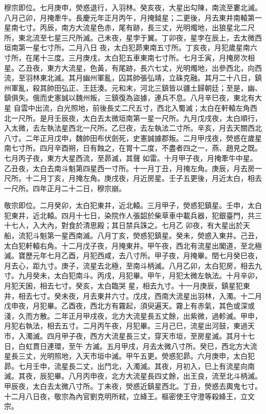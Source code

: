 \begin{pinyinscope}
 穆宗即位。七月庚申，熒惑退行，入羽林。癸亥夜，大星出勾陳，南流至婁北滅。八月己卯，月掩牽牛。長慶元年正月丙午，月掩鉞星；二更後，月去東井南轅第一星南七寸。丙辰，南方大流星色赤，尾有跡，長三丈，光明燭地，出狼星北二尺所，東北流至七星三尺所滅。己未夜，星孛于翼。丁卯夜，星孛在辰上，去太微西垣南第一星七寸所。二月八日
 夜，太白犯昴東南五寸所。丁亥夜，月犯歲星南六寸所，在尾十三度。三月庚戌，太白犯五車東南七寸所。七月壬寅，月掩房次相星。乙丑夜，東方大流星，色黃，有尾跡，長六七丈，光明燭地，出參西北，向西流，至羽林東北滅。其月幽州軍亂，囚其帥張弘靖，立硃克融。其月二十八日，鎮州軍亂，殺其帥田弘正、王廷湊。元和末，河北三鎮皆以疆土歸朝廷；至是，幽、鎮俱失。俄而史憲誠以魏州叛，三鎮復為盜據，連兵不息。八月辛巳夜，東北有大星
 自雲中出流，白光照地，前後長丈二尺五寸，西北入蜀滅；太白在軒轅左角西北一尺所。是月壬辰夜，太白去太微垣南第一星一尺所。九月戊戌夜，太白順行，入太微，去左執法星西北一尺所。乙巳夜，去左執法二寸所。辛亥，月去天關西北八寸。二年正月戊申，魏帥田布伏劍死，史憲誠據郡叛。二月甲戌夜，熒惑在歲星南七寸所。四月辛酉朔，日有蝕之，在胃十二度，不盡者四之一，燕、趙見之既。七月丙子夜，東方大星西流，至昴滅，其聲
 如雷。十月甲子夜，月掩牽牛中星。乙丑夜，太白去南斗魁第四星西一寸所。十一月丁丑，月掩左角。庚辰，月去房一尺所。十二月丁亥，月掩左角。庚戌夜，月近房星。壬子五更後，月近太白，相去一尺所。四年正月二十二日，穆宗崩。



 敬宗即位。二月癸卯，太白犯東井，近北轅。三月甲子，熒惑犯鎮星。壬申，太白犯東井，近北轅。四月十七日，染院作人張韶於柴草車中載兵器，犯銀臺門，共三十七人，入大內，對食於清思殿；其日禁兵誅之。七月乙
 卯夜，有大星出於天船，流犯斗魁第一星西南滅。八月丁亥，熒惑犯鎮星。癸未，熒惑入東井。己丑，太白犯軒轅右角。十二月戊子夜，月掩東井。甲午夜，西北有流星出閣道，至北極滅。寶歷元年七月乙酉，月犯西咸，去八寸所。甲子夜，月掩畢。閏七月癸巳夜，月去心，距九寸。庚子，流星去北極，至南斗柄滅。八月乙卯，太白犯房，相去九寸。九月癸未，太白犯南斗。丙戌，月犯畢。甲午，月犯太微左執法。十月辛卯，月犯天囷，相去七寸。癸亥，太白臨哭
 星，相去九寸。十一月庚辰，鎮星犯東井，相去七寸。癸未夜，月去東井六寸。戊戌，西南大流星出羽林，入濁。十二月戊申夜，月犯畢。乙酉夜，西北方有霧起，須臾遍天。霧上有赤氣，其色或深或淺，久而方散。二年正月甲戌夜，北方大流星長五丈餘，出紫微，過軫滅。甲申，月犯右執法，相去五寸。二月丙午夜，月犯畢。三月己巳，流星出河鼓，東過天市，入濁滅。四月甲子夜，西方大流星長三丈，穿天市垣，至房星滅。其月十七日，白虹貫日連環，至午
 方滅。五月甲戌，月去太微八寸所。癸巳，西北方大流星長三丈，光明照地，入天市垣中滅。甲午五更。熒惑犯昴。六月庚申，太白犯昴。七月壬申，流星長二丈，出鬥北，入濁滅。其夜，月初入，巳上有流星向南滅。其夜，辰犯畢。八月丙申夜，北方大流星長四丈餘，出王良，流至北斗柄滅。甲辰夜，太白去太微八寸所。丁未夜，熒惑近鎮星西北。丁丑，熒惑去輿鬼七寸。十二月八日夜，敬宗為內官劉克明所弒，立絳王。樞密使王守澄等殺絳王，立文宗。




\end{pinyinscope}
